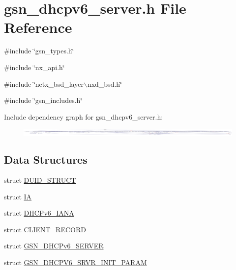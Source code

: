 \hypertarget{a00483}{
\section{gsn\_\-dhcpv6\_\-server.h File Reference}
\label{a00483}
}
{\ttfamily \#include \char`\"{}gsn\_\-types.h\char`\"{}}\par
{\ttfamily \#include \char`\"{}nx\_\-api.h\char`\"{}}\par
{\ttfamily \#include \char`\"{}netx\_\-bsd\_\-layer$\backslash$nxd\_\-bsd.h\char`\"{}}\par
{\ttfamily \#include \char`\"{}gsn\_\-includes.h\char`\"{}}\par
Include dependency graph for gsn\_\-dhcpv6\_\-server.h:
\nopagebreak
\begin{figure}[H]
\begin{center}
\leavevmode
\includegraphics[width=400pt]{a00712}
\end{center}
\end{figure}
\subsection*{Data Structures}
\begin{DoxyCompactItemize}
\item 
struct \hyperlink{a00017}{DUID\_\-STRUCT}
\item 
struct \hyperlink{a00448}{IA}
\item 
struct \hyperlink{a00012}{DHCPv6\_\-IANA}
\item 
struct \hyperlink{a00011}{CLIENT\_\-RECORD}
\item 
struct \hyperlink{a00047}{GSN\_\-DHCPv6\_\-SERVER}
\item 
struct \hyperlink{a00048}{GSN\_\-DHCPV6\_\-SRVR\_\-INIT\_\-PARAM}
\end{DoxyCompactItemize}
